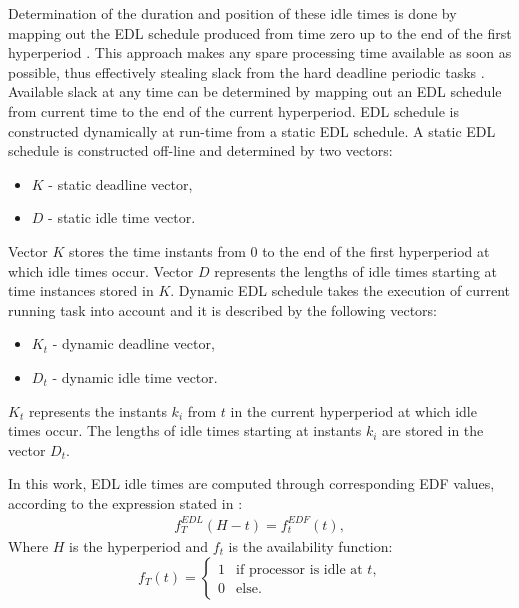Determination  of  the  duration  and  position  of  these  idle  times  is  done  by mapping out the EDL schedule produced from time zero up to the end of the first hyperperiod \cite{ghor2011real}.
This approach makes any spare processing time available as soon as possible, 
thus effectively stealing slack from the hard deadline periodic tasks 
\cite{queudet2012quality}. 
Available slack at any time can be determined by mapping out an EDL schedule from current time to the end of the current hyperperiod.
EDL schedule is constructed dynamically at run-time from a static EDL schedule.
A static EDL schedule is constructed off-line and determined by two vectors:
\begin{itemize}
	\item{$K$ - static deadline vector,}
	\item{$D$ - static idle time vector.}
\end{itemize}
Vector $K$ stores the time instants from 0 to the end of the first hyperperiod at which idle times occur. 
Vector $D$ represents the lengths of idle times starting at time instances stored in $K$. 
Dynamic EDL schedule takes the execution of current running task into account and it is described by the following vectors:
\begin{itemize}
	\item{$K_t$} - dynamic deadline vector,
	\item{$D_t$} - dynamic idle time vector.
\end{itemize}
$K_t$ represents the instants $k_i$ from $t$ in the current hyperperiod at which idle times occur. 
The lengths of idle times starting at instants $k_i$ are stored in the vector $D_t$. 


In this work, EDL idle times are computed through corresponding EDF values, according to the expression stated in \cite{chetto1989some}:
\begin{align}
f_T^{EDL}(H - t) = f_t^{EDF}(t),
\end{align}
Where $H$ is the hyperperiod and $f_t$ is the availability function:
\begin{equation*}
f_T(t) = \begin{cases}
1 &\text{if processor is idle at $t$,}\\
0 &\text{else.}
\end{cases}
\end{equation*}

